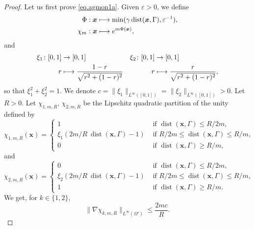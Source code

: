 \documentclass[10pt]{amsart}
\newcommand\mto{\mathchoice{\longmapsto}{\mapsto}{\mapsto}{\mapsto}}
\DeclareMathOperator{\dist}{dist}
\theoremstyle{plain}
\theoremstyle{definition}
\newcommand{\bx}{{\boldsymbol x}}
\let\eps\varepsilon
\begin{document}
\begin{proof}
Let us first prove \eqref{eq.agmon1a}. Given $\eps>0$, we define
\begin{align*}
\Phi : \bx &\mto \min(\gamma \dist(\bx, \Gamma),\eps^{-1}),
\\
\chi_m : \bx&\mto e^{m\Phi(\bx)},
\end{align*}
and
\begin{align*}
\xi_1\colon [0,1]&\to [0,1]&\xi_2\colon [0,1]&\to [0,1]\\
r&\mto\frac{1-r}{\sqrt{r^2+(1-r)^2}}
&r&\mto\frac{r}{\sqrt{r^2+(1-r)^2}},
\end{align*}
so that $\xi_1^2 + \xi_2^2 = 1$.
We denote $c = \|\xi_1\|_{L^\infty([0,1])} = \|\xi_2\|_{L^\infty([0,1])}>0$.
Let $R>0$.
Let $\chi_{1,m,R},\, \chi_{2,m,R}$ be the Lipschitz quadratic partition of the unity defined by
\[
\chi_{1,m,R}(\bx) = \begin{cases}
1 &\mbox{ if } \dist(\bx,\Gamma)\leq R/2m,\\
\xi_1(2m/R\ \dist(\bx,\Gamma)-1)&\mbox{ if } R/2m\leq\dist(\bx, \Gamma)\leq R/m,\\
0 &\mbox{ if } \dist(\bx, \Gamma)\geq R/m,
\end{cases}
\]
and
\[
\chi_{2,m,R}(\bx) = \begin{cases}
0 &\mbox{ if } \dist(\bx,\Gamma)\leq R/2m,\\
\xi_2(2m/R\ \dist(\bx,\Gamma)-1)&\mbox{ if } R/2m\leq\dist(\bx, \Gamma)\leq R/m,\\
1 &\mbox{ if } \dist(\bx, \Gamma)\geq R/m.
\end{cases}
\]
We get, for $k\in \{1,2\}$,
\[
\|\nabla \chi_{k,m,R}\|_{L^\infty(\Omega')}\leq \frac{2m c}{R}.
\]


\end{proof}
\end{document}

